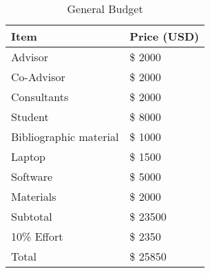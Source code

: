 \begin{table}[h]
\centering

\begin{tabular}{l|l}
\hline
 \textbf{Item} & \textbf{Price (USD)}    \\ \hline
 Advisor& \$ 2000    \\
 Co-Advisor&  \$ 2000     \\
 Consultants& \$ 2000      \\
 Student&    \$ 8000   \\
 Bibliographic material & \$ 1000 \\
 Laptop&   \$ 1500    \\
 Software&  \$ 5000    \\
 Materials&   \$ 2000    \\ \hline \hline
 Subtotal&  \$ 23500     \\ 
 10\% Effort & \$ 2350      \\ \hline \hline
 Total&  \$   25850   \\ \hline \hline
\end{tabular}
\caption{\label{table1} General Budget}
\end{table}